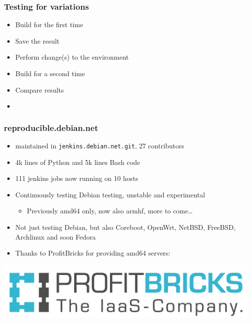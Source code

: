 \documentclass[14pt]{beamer}
\begin{document}
\begin{frame}
 \frametitle{Testing for variations}

 \begin{itemize}
  \item Build for the first time
  \item Save the result
  \item Perform change(s) to the environment
  \item Build for a second time
  \item Compare results
  \item{}
 \end{itemize}
\end{frame}

\begin{frame}
 \frametitle{reproducible.debian.net}

 \begin{itemize}
  \item maintained in \texttt{jenkins.debian.net.git}, 27 contributors
  \item 4k lines of Python and 5k lines Bash code
  \item 111 jenkins jobs now running on 10 hosts
  \item Continuously testing Debian testing, unstable and experimental
  \begin{itemize}
   \item Previously amd64 only, now also armhf, more to come…
  \end{itemize}
  \item Not just testing Debian, but also Coreboot, OpenWrt, NetBSD, FreeBSD,
  Archlinux and soon Fedora
  \item Thanks to ProfitBricks for providing amd64 servers:
 \end{itemize}
 \vfill
 \begin{center}
 \includegraphics[height=0.15\paperheight]{images/profitbricks_logo.png}
 \end{center}
\end{frame}
\end{document}
